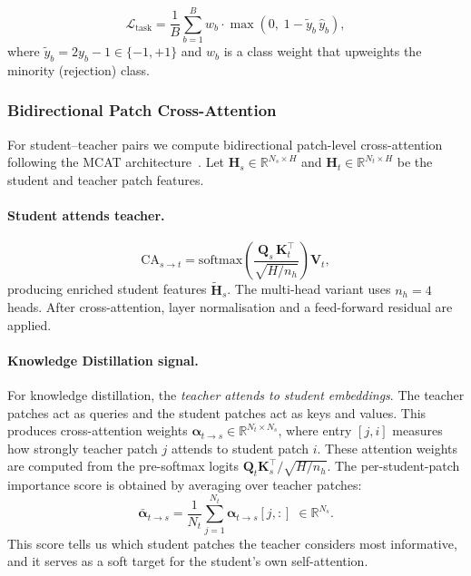 \documentclass[11pt,a4paper]{article}
\begin{document}
\begin{equation}
    \mathcal{L}_\text{task} = \frac{1}{B}\sum_{b=1}^{B}
        w_b\cdot\max\!\left(0,\; 1 - \tilde{y}_b\,\hat{y}_b\right),
    \label{eq:hinge}
\end{equation}
where $\tilde{y}_b = 2y_b - 1 \in\{-1,+1\}$ and $w_b$ is a class weight that
upweights the minority (rejection) class.

\subsubsection{Bidirectional Patch Cross-Attention}

For student--teacher pairs we compute bidirectional patch-level cross-attention
following the MCAT architecture~\cite{chen2021mcat}.
Let $\mathbf{H}_s\in\mathbb{R}^{N_s\times H}$ and
$\mathbf{H}_t\in\mathbb{R}^{N_t\times H}$ be the student and teacher patch
features.

\paragraph{Student attends teacher.}
\begin{equation}
    \text{CA}_{s\to t} = \text{softmax}\!\left(
        \frac{\mathbf{Q}_s\,\mathbf{K}_t^\top}{\sqrt{H/n_h}}\right)\mathbf{V}_t,
\end{equation}
producing enriched student features $\tilde{\mathbf{H}}_s$.
The multi-head variant uses $n_h = 4$ heads.
After cross-attention, layer normalisation and a feed-forward residual are
applied.

\paragraph{Knowledge Distillation signal.}
For knowledge distillation, the \emph{teacher attends to student embeddings}.
The teacher patches act as queries and the student patches act as keys and
values.
This produces cross-attention weights
$\boldsymbol{\alpha}_{t\to s}\in\mathbb{R}^{N_t\times N_s}$, where entry
$[j, i]$ measures how strongly teacher patch $j$ attends to student patch $i$.
These attention weights are computed from the pre-softmax logits
$\mathbf{Q}_t\mathbf{K}_s^\top / \sqrt{H/n_h}$.
The per-student-patch importance score is obtained by averaging over teacher
patches:
\begin{equation}
    \bar{\boldsymbol{\alpha}}_{t\to s} = \frac{1}{N_t}
        \sum_{j=1}^{N_t}\boldsymbol{\alpha}_{t\to s}[j,:]\;\in\mathbb{R}^{N_s}.
\end{equation}
This score tells us which student patches the teacher considers most
informative, and it serves as a soft target for the student's own
self-attention.
\end{document}
